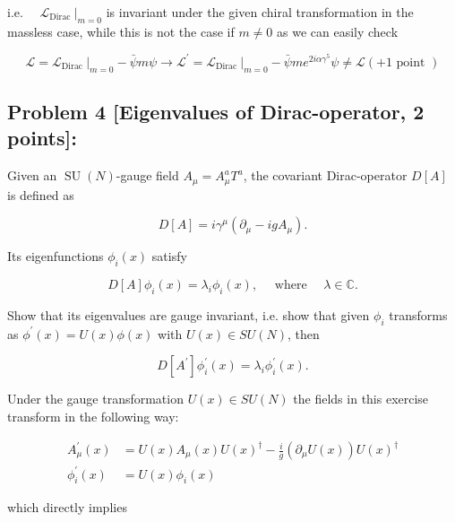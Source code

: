 \documentclass[10pt, letterpaper]{article}
\begin{document}
i.e. $\left.\quad \mathcal{L}_{\text {Dirac }}\right|_{m=0}$ is invariant under the given chiral transformation in the massless case, while this is not the case if $m \neq 0$ as we can easily check

$$
\mathcal{L}=\left.\mathcal{L}_{\text {Dirac }}\right|_{m=0}-\bar{\psi} m \psi \longrightarrow \mathcal{L}^{\prime}=\left.\mathcal{L}_{\text {Dirac }}\right|_{m=0}-\bar{\psi} m e^{2 i \alpha \gamma^5} \psi \neq \mathcal{L}(+1 \text { point })
$$


\subsection{Problem 4 [Eigenvalues of Dirac-operator, 2 points]:}

Given an $\operatorname{SU}(N)$-gauge field $A_\mu=A_\mu^a T^a$, the covariant Dirac-operator $D[A]$ is defined as

$$
D[A]=i \gamma^\mu\left(\partial_\mu-i g A_\mu\right) .
$$

Its eigenfunctions $\phi_i(x)$ satisfy

$$
D[A] \phi_i(x)=\lambda_i \phi_i(x), \quad \text { where } \quad \lambda \in \mathbb{C} .
$$

Show that its eigenvalues are gauge invariant, i.e. show that given $\phi_i$ transforms as $\phi^{\prime}(x)= U(x) \phi(x)$ with $U(x) \in S U(N)$, then

$$
D\left[A^{\prime}\right] \phi_i^{\prime}(x)=\lambda_i \phi_i^{\prime}(x) .
$$


Under the gauge transformation $U(x) \in S U(N)$ the fields in this exercise transform in the following way:

$$
\begin{aligned}
A_\mu^{\prime}(x) & =U(x) A_\mu(x) U(x)^{\dagger}-\frac{i}{g}\left(\partial_\mu U(x)\right) U(x)^{\dagger} \\
\phi_i^{\prime}(x) & =U(x) \phi_i(x)
\end{aligned}
$$

which directly implies
\end{document}
